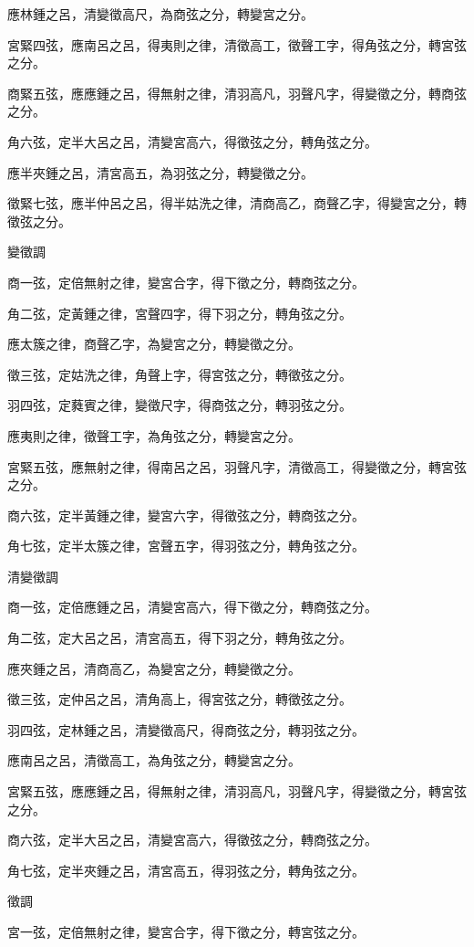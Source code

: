 \begin{pinyinscope}
應林鍾之呂，清變徵高尺，為商弦之分，轉變宮之分。

宮緊四弦，應南呂之呂，得夷則之律，清徵高工，徵聲工字，得角弦之分，轉宮弦之分。

商緊五弦，應應鍾之呂，得無射之律，清羽高凡，羽聲凡字，得變徵之分，轉商弦之分。

角六弦，定半大呂之呂，清變宮高六，得徵弦之分，轉角弦之分。

應半夾鍾之呂，清宮高五，為羽弦之分，轉變徵之分。

徵緊七弦，應半仲呂之呂，得半姑洗之律，清商高乙，商聲乙字，得變宮之分，轉徵弦之分。

變徵調

商一弦，定倍無射之律，變宮合字，得下徵之分，轉商弦之分。

角二弦，定黃鍾之律，宮聲四字，得下羽之分，轉角弦之分。

應太簇之律，商聲乙字，為變宮之分，轉變徵之分。

徵三弦，定姑洗之律，角聲上字，得宮弦之分，轉徵弦之分。

羽四弦，定蕤賓之律，變徵尺字，得商弦之分，轉羽弦之分。

應夷則之律，徵聲工字，為角弦之分，轉變宮之分。

宮緊五弦，應無射之律，得南呂之呂，羽聲凡字，清徵高工，得變徵之分，轉宮弦之分。

商六弦，定半黃鍾之律，變宮六字，得徵弦之分，轉商弦之分。

角七弦，定半太簇之律，宮聲五字，得羽弦之分，轉角弦之分。

清變徵調

商一弦，定倍應鍾之呂，清變宮高六，得下徵之分，轉商弦之分。

角二弦，定大呂之呂，清宮高五，得下羽之分，轉角弦之分。

應夾鍾之呂，清商高乙，為變宮之分，轉變徵之分。

徵三弦，定仲呂之呂，清角高上，得宮弦之分，轉徵弦之分。

羽四弦，定林鍾之呂，清變徵高尺，得商弦之分，轉羽弦之分。

應南呂之呂，清徵高工，為角弦之分，轉變宮之分。

宮緊五弦，應應鍾之呂，得無射之律，清羽高凡，羽聲凡字，得變徵之分，轉宮弦之分。

商六弦，定半大呂之呂，清變宮高六，得徵弦之分，轉商弦之分。

角七弦，定半夾鍾之呂，清宮高五，得羽弦之分，轉角弦之分。

徵調

宮一弦，定倍無射之律，變宮合字，得下徵之分，轉宮弦之分。


\end{pinyinscope}
